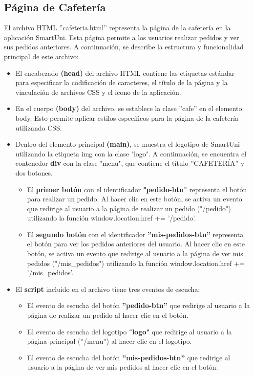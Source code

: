 \documentclass[12pt]{report}
\begin{document}
\subsection{Página de Cafetería}
El archivo HTML ''cafeteria.html'' representa la página de la cafetería en la aplicación SmartUni. Esta página permite a los usuarios realizar pedidos y ver sus pedidos anteriores. A continuación, se describe la estructura y funcionalidad principal de este archivo:

\begin{itemize}
    \item El encabezado \textbf{(head)} del archivo HTML contiene las etiquetas estándar para especificar la codificación de caracteres, el título de la página y la vinculación de archivos CSS y el icono de la aplicación.

    \item En el cuerpo \textbf{(body)} del archivo, se establece la clase ''cafe'' en el elemento body. Esto permite aplicar estilos específicos para la página de la cafetería utilizando CSS.

    \item Dentro del elemento principal \textbf{(main)}, se muestra el logotipo de SmartUni utilizando la etiqueta img con la clase "logo". A continuación, se encuentra el contenedor \textbf{div} con la clase "menu", que contiene el título ''CAFETERÍA'' y dos botones.

    \begin{itemize}
        \item El\textbf{ primer botón} con el identificador \textbf{"pedido-btn"} representa el botón para realizar un pedido. Al hacer clic en este botón, se activa un evento que redirige al usuario a la página de realizar un pedido ("/pedido") utilizando la función window.location.href += '/pedido'.
        
        \item El \textbf{segundo botón }con el identificador \textbf{''mis-pedidos-btn'' }representa el botón para ver los pedidos anteriores del usuario. Al hacer clic en este botón, se activa un evento que redirige al usuario a la página de ver mis pedidos ("/mis\_pedidos") utilizando la función window.location.href += '/mis\_pedidos'.
    \end{itemize}

    \item El \textbf{script } incluido en el archivo tiene tres eventos de escucha:

    \begin{itemize}
        \item El evento de escucha del botón \textbf{''pedido-btn''} que redirige al usuario a la página de realizar un pedido al hacer clic en el botón.
        \item El evento de escucha del logotipo \textbf{"logo"} que redirige al usuario a la página principal (''/menu'') al hacer clic en el logotipo.
        \item El evento de escucha del botón \textbf{''mis-pedidos-btn''} que redirige al usuario a la página de ver mis pedidos al hacer clic en el botón.
    \end{itemize}
\end{itemize}
\end{document}
